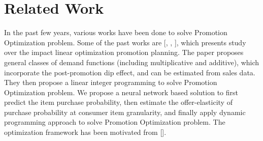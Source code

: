 \section{Related Work}
\label{sec:relatedwork}
In the past few years, various works have been done to solve Promotion Optimization problem.
Some of the past works are [\cite{cohen2018promotion}, \cite{cohen2017impact}, \cite{cohen2020optimizing}], 
which presents study over the impact 
linear optimization promotion planning. 
The paper proposes general classes of demand functions 
(including multiplicative and additive), which incorporate the post-promotion dip effect, and can 
be estimated from sales data. They then propose a linear integer programming to solve Promotion
Optimization problem. We propose a neural network based solution to first predict the 
item purchase probability, then estimate the offer-elasticity of purchase probability at consumer item granularity,
and finally apply dynamic programming approach to solve Promotion Optimization problem.
The optimization framework has been motivated from [\cite{ferreira2016analytics}].